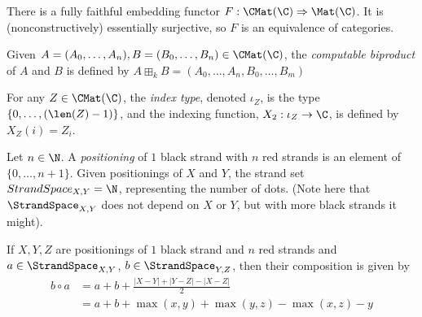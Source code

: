   There is a fully faithful embedding functor $F: \CMat(\C) \Rightarrow \Mat (\C)$.
  It is (nonconstructively) essentially surjective, so $F$ is an equivalence
  of categories.
\begin{definition}
  Given $A = (A_0, \ldots, A_n), B=(B_0, \ldots, B_n)\in \CMat(\C)$, the
  \emph{computable biproduct} of $A$ and $B$ is defined by $A\boxplus_k B = (A_0, \ldots, A_n, B_0, \ldots, B_m)$
\end{definition}
\begin{definition}
  For any $Z\in \CMat (\C)$, the \emph{index type}, denoted $\iota_Z$, is the type
  $\{ 0, \ldots, (\len(Z)-1)\}$, and the indexing function, $X_2: \iota_Z\to \C$,
  is defined by $X_Z(i) = Z_i$.
\end{definition}

\begin{definition}
  Let $n\in \N$. A \emph{positioning} of $1$ black strand with $n$ red strands is
  an element of $\{0, \ldots, n+1\}$. Given positionings of $X$
  and $Y$, the strand set $StrandSpace_{X, Y} = \N$, representing
  the number of dots. (Note here that $\StrandSpace_{X, Y}$ does not depend on
  $X$ or $Y$, but with more black strands it might).
\end{definition}

\begin{definition}
  If $X, Y, Z$ are positionings of $1$ black strand and $n$ red strands
  and $a\in \StrandSpace_{X, Y}$, $b\in \StrandSpace_{Y, Z}$, then their
  composition is given by
  \begin{align*}
    b\circ a &= a + b + \frac{|X-Y| + |Y-Z| - |X-Z|}{2}
    \\ &= a + b + \max (x, y) + \max (y, z) - \max (x, z) - y
  \end{align*}
\end{definition}

